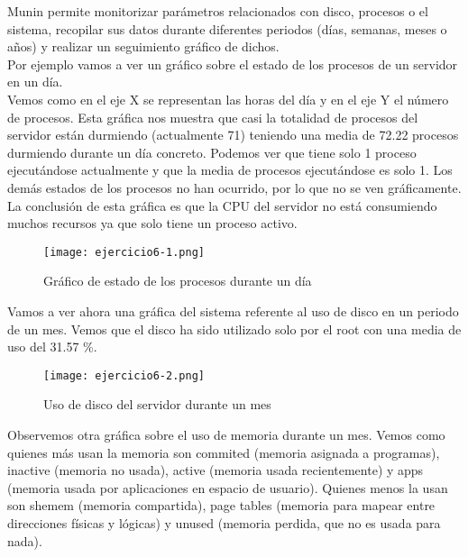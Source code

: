 	
	Munin\cite{ejercicio6-1} permite monitorizar parámetros relacionados con  disco, procesos o el sistema, recopilar sus datos durante diferentes periodos (días, semanas, meses o años) y realizar un seguimiento gráfico de dichos.\\
	
	Por ejemplo vamos a ver un gráfico sobre el estado de los procesos de un servidor en un día.\\
	Vemos como en el eje X se representan las horas del día y en el eje Y el número de procesos. Esta gráfica nos muestra que casi la totalidad de procesos del servidor están durmiendo (actualmente 71) teniendo una media de 72.22 procesos durmiendo durante un día concreto. Podemos ver que tiene solo 1 proceso ejecutándose actualmente y que la media de procesos ejecutándose es solo 1. Los demás estados de los procesos no han ocurrido, por lo que no se ven gráficamente.\\
	
	La conclusión de esta gráfica es que la CPU del servidor no está consumiendo muchos recursos ya que solo tiene un proceso activo.
	\begin{figure}[H] 
		\centering
		\texttt{[image: ejercicio6-1.png]} 
		\label{figura2} 			
		\caption{Gráfico de estado de los procesos durante un día}
	\end{figure}


	Vamos a ver ahora una gráfica del sistema referente al uso de disco en un periodo de un mes. Vemos que el disco ha sido utilizado solo por el root con una media de uso del 31.57 \%.
	\begin{figure}[H] 
		\centering
		\texttt{[image: ejercicio6-2.png]} 
		\label{figura2} 			
		\caption{Uso de disco del servidor durante un mes}
	\end{figure}


	Observemos otra gráfica sobre el uso de memoria durante un mes. Vemos como quienes más usan la memoria son commited (memoria asignada a programas), inactive (memoria no usada), active (memoria usada recientemente) y apps (memoria usada por aplicaciones en espacio de usuario). Quienes menos la usan son shemem (memoria compartida), page tables (memoria para mapear entre direcciones físicas y lógicas) y unused (memoria perdida, que no es usada para nada).\\
	
